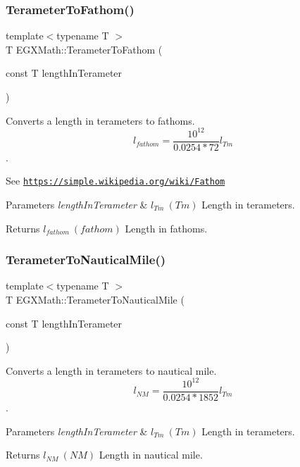 \subsubsection{\texorpdfstring{Terameter\+To\+Fathom()}{TerameterToFathom()}}
{\footnotesize\ttfamily template$<$typename T $>$ \\
T E\+G\+X\+Math\+::\+Terameter\+To\+Fathom (\begin{DoxyParamCaption}\item[{const T}]{length\+In\+Terameter }\end{DoxyParamCaption})}



Converts a length in terameters to fathoms. \[ l_{fathom}= \frac{10^{12}}{0.0254 * 72} l_{Tm} \]. 

See \href{https://simple.wikipedia.org/wiki/Fathom}{\tt https\+://simple.\+wikipedia.\+org/wiki/\+Fathom} 
\begin{DoxyParams}{Parameters}
{\em length\+In\+Terameter} & $ l_{Tm}\ (Tm)$ Length in terameters. \\
\hline
\end{DoxyParams}
\begin{DoxyReturn}{Returns}
$ l_{fathom}\ (fathom)$ Length in fathoms. 
\end{DoxyReturn}
\mbox{\label{group___e_g_x_math-_conversions-_length_conversions-_terameter-_nautical_ga6a799ea329334a189c2ed5a898a238af}} 
\subsubsection{\texorpdfstring{Terameter\+To\+Nautical\+Mile()}{TerameterToNauticalMile()}}
{\footnotesize\ttfamily template$<$typename T $>$ \\
T E\+G\+X\+Math\+::\+Terameter\+To\+Nautical\+Mile (\begin{DoxyParamCaption}\item[{const T}]{length\+In\+Terameter }\end{DoxyParamCaption})}



Converts a length in terameters to nautical mile. \[ l_{NM}= \frac{10^{12}}{0.0254 * 1852} l_{Tm} \]. 


\begin{DoxyParams}{Parameters}
{\em length\+In\+Terameter} & $ l_{Tm}\ (Tm)$ Length in terameters. \\
\hline
\end{DoxyParams}
\begin{DoxyReturn}{Returns}
$ l_{NM}\ (NM)$ Length in nautical mile. 
\end{DoxyReturn}
